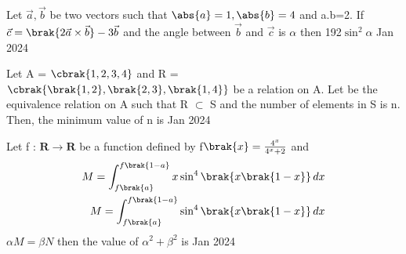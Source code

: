 \bigskip
\item Let $\vec{a},\vec{b}$ be two vectors such that $\abs{a}=1,\abs{b}=4$ and a.b=2. If $\vec{c}=\brak{2\vec{a}\times\vec{b}}-3\vec{b}$ and the angle between $\vec{b}$ and $\vec{c}$ is $\alpha$ then 192$\sin^2{\alpha}$ \hfill{Jan 2024}
\bigskip
\item Let A = $\cbrak{1, 2, 3, 4}$ and R = $\cbrak{\brak{1, 2}, \brak{2, 3}, \brak{1, 4}}$ be a relation on A. Let  be the equivalence relation on A such that R $\subset$ S and the number of elements in S is n. Then, the minimum value of n is \hfill{Jan 2024}
\bigskip
\item Let f : $\mathbf{R} \rightarrow \mathbf{R}$ be a function defined by f$\brak{x}=\frac{4^x}{4^x+2}$ and 
\begin{align*}
    M=\int_{f\brak{a}}^{f\brak{1-a}} x\sin^{4}\brak{x\brak{1-x}}\,dx\\
    M=\int_{f\brak{a}}^{f\brak{1-a}} \sin^{4}\brak{x\brak{1-x}}\,dx   
\end{align*}
$\alpha M=\beta N$ then the value of $\alpha^2+\beta^2$ is \hfill{Jan 2024}

